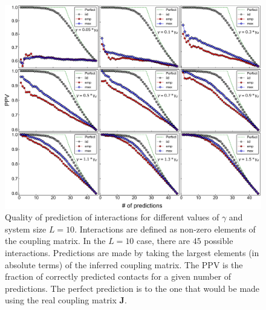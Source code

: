 \documentclass[preprint,amsmath,amssymb,superscriptaddress,showpacs,pre]{revtex4-1}
\begin{document}
  
\begin{figure}[!htb]
	\centering
	\includegraphics[keepaspectratio=true,width=1.0\textwidth]{Figures/PPVs_L10.pdf}
	\caption{Quality of prediction of interactions for  different values of $\gamma$ and system size $L=10$. Interactions are defined as non-zero elements of the coupling matrix. In the $L=10$ case, there are $45$ possible interactions. Predictions are made by taking the largest elements (in absolute terms) of the inferred coupling matrix. The PPV is the fraction of correctly predicted contacts for a given number of predictions. The perfect prediction is to the one that would be made using the real coupling matrix $\bm{J}$.}
	\label{fig:PPV_L10}
\end{figure}
\end{document}
